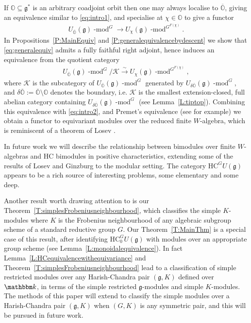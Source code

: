 \documentclass[twoside,12pt,reqno]{amsart}
\theoremstyle{remark}
\numberwithin{equation}{section}
\def\isoto{\overset{\sim}{\longrightarrow}}
\def\k{{\mathbbm k}}
\def\lmod{\!\operatorname{-mod}}
\def\O{{\mathbb O}}
\def\HC{\mathrm{HC}}
\def\g{{\mathfrak g}}
\begin{document}
If $\O \subseteq \g^*$ is an arbitrary coadjoint orbit then one may always localise to $\overline\O$, giving an equivalence similar to \eqref{eq:intro1}, and specialise at $\chi\in\O$ to give a functor
\begin{eqnarray}
\label{eq:generalequiv}
    U_{\overline{\O}}(\g)\lmod^G \to U_{\chi}(\g)\lmod^{G^{F(\chi)}}.
\end{eqnarray}
In Propositions~\ref{P:MainEquiv} and \ref{P:generalequivalencebydescent} we show that \eqref{eq:generalequiv} admits a fully faithful right adjoint, hence induces an equivalence from the quotient category
\begin{eqnarray}
    U_{\overline{\O}}(\g)\lmod^G / \mathcal{K} \isoto U_\chi(\g)\lmod^{G^{F(\chi)}},
\end{eqnarray}
where $\mathcal{K}$ is the subcategory of $U_{\overline{\O}}(\g)\lmod^G$ generated by $U_{\delta \overline\O}(\g)\lmod^G$, and $\delta \overline\O := \overline\O \setminus \O$ denotes the boundary, i.e. $\mathcal{K}$ is the smallest extension-closed, full abelian category containing $U_{\delta \overline\O}(\g)\lmod^G$ (see Lemma~\ref{L:tiptop}). Combining this equivalence with \eqref{eq:intro2}, and Premet's equivalence (see \cite[Lemma~2.2(ii)]{Pr} for example) we obtain a functor to equivariant modules over the reduced finite $W$-algebra, which is reminiscent of a theorem of Losev \cite[Theorem~1.3.1(5)]{LoFDRWA}.

In future work we will describe the relationship between bimodules over finite $W$-algebras and HC bimodules in positive characteristics, extending some of the results of Losev \cite{LoFDRWA} and Ginzburg \cite{Gi} to the modular setting. The category $\HC^G U(\g)$ appears to be a rich source of interesting problems, some elementary and some deep. 

Another result worth drawing attention to is our Theorem~\ref{T:simplesFrobeniusneighbourhood}, which classifies the simple $K$-modules where $K$ is the Frobenius neighbourhood of any algebraic subgroup scheme of a standard reductive group $G$. Our Theorem~\ref{T:MainThm} is a special case of this result, after identifying $\HC_0^G U(\g)$ with modules over an appropriate group scheme (see Lemma~\ref{L:monoidalequivalence}). In fact Lemma~\ref{L:HCequivalencewithequivariance} and Theorem~\ref{T:simplesFrobeniusneighbourhood} lead to a classification of simple restricted modules over any Harish-Chandra pair $(\g, K)$ defined over $\k$, in terms of the simple restricted $\g$-modules and simple $K$-modules. The methods of this paper will extend to classify the simple modules over a Harish-Chandra pair $(\g, K)$ when $(G,K)$ is any symmetric pair, and this will be pursued in future work.
\end{document}
